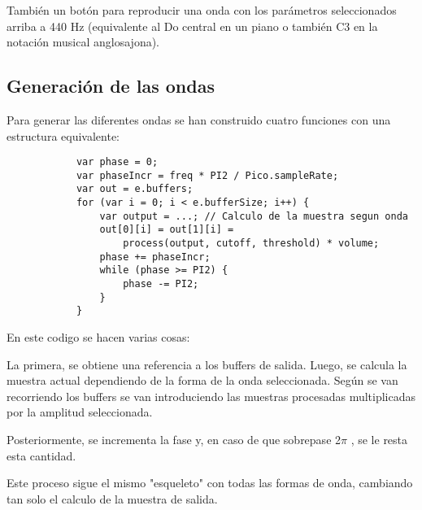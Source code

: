\documentclass[a4paper]{article}
\begin{document}
        También un botón para reproducir una onda con los parámetros
        seleccionados arriba a 440 Hz (equivalente al Do central en
        un piano o también C3 en la notación musical anglosajona).

        \subsection{Generación de las ondas}
            Para generar las diferentes ondas se han construido
            cuatro funciones con una estructura equivalente:
            \begin{verbatim}
            var phase = 0;
            var phaseIncr = freq * PI2 / Pico.sampleRate;
            var out = e.buffers;
            for (var i = 0; i < e.bufferSize; i++) {
                var output = ...; // Calculo de la muestra segun onda
                out[0][i] = out[1][i] =
                    process(output, cutoff, threshold) * volume;
                phase += phaseIncr;
                while (phase >= PI2) {
                    phase -= PI2;
                }
            }
            \end{verbatim}
            En este codigo se hacen varias cosas:

            La primera, se obtiene una referencia a los buffers de
            salida. Luego, se calcula la muestra actual dependiendo
            de la forma de la onda seleccionada. Según se van recorriendo
            los buffers se van introduciendo las muestras procesadas
            multiplicadas por la amplitud seleccionada.

            Posteriormente, se incrementa la fase y, en caso de que
            sobrepase 2$\pi$ , se le resta esta cantidad.

            Este proceso sigue el mismo "esqueleto" con todas las
            formas de onda, cambiando tan solo el calculo de la
            muestra de salida.
\end{document}
